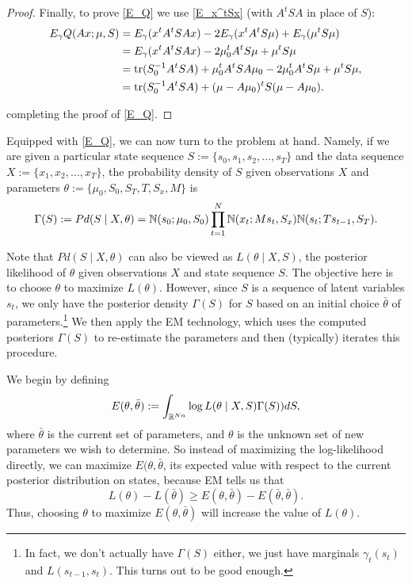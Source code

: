 \documentclass[12pt,leqno]{article}
\begin{document}
\begin{proof}
    Finally, to prove \eqref{E_Q} we  use \eqref{E_x^tSx} (with $A^tSA$ in place of $S$):
      \begin{align*}
        E_{\gamma}Q(Ax;\mu,S) &= E_{\gamma}(x^tA^tSAx) - 2E_{\gamma}(x^tA^tS\mu) + E_{\gamma}(\mu^tS\mu) \\
        &= E_{\gamma}(x^tA^tSAx) - 2\mu_0^tA^tS\mu + \mu^tS\mu\\
        &= \tr(S_0^{-1}A^tSA) + \mu_0^tA^tSA\mu_0 - 2\mu_0^tA^tS\mu + \mu^tS\mu,\\
        &= \tr(S_0^{-1}A^tSA) + (\mu-A\mu_0)^tS(\mu- A\mu_0). %
      \end{align*}

completing the proof of \eqref{E_Q}.
  \end{proof}
  
Equipped with \eqref{E_Q}, we can now turn to the problem at hand.  Namely, if we are given a particular
state sequence $S := \{s_0,s_1,s_2,\dots,s_T\}$ and the data sequence $X := \{x_1,x_2,\dots,x_T\}$,
the probability density of $S$ given observations $X$ and  parameters $\theta := \{\mu_0,S_0,S_T,T,S_x,M\}$ is
\begin{equation} \label{density}
\Gamma(S) := Pd(S\mid X,\theta) = {\mathbb N}(s_0;\mu_0,S_0)\prod_{t=1}^N{\mathbb N}(x_t;Ms_t,S_x){\mathbb N}(s_t;Ts_{t-1},S_T).
\end{equation}

Note that $Pd(S\mid X, \theta)$ can also be viewed as  $L(\theta\mid X,S)$, the posterior likelihood of $\theta$
given observations $X$ and state sequence $S$.  The objective here is to choose $\theta$ to maximize $L(\theta)$.
However, since $S$ is a sequence of latent variables $s_t$, we only have the posterior density $\Gamma(S)$ for $S$
based on an initial choice $\bar{\theta}$ of parameters.\footnote{In fact, we don't actually have $\Gamma(S)$ either, we just have marginals $\gamma_t(s_t)$ and $L(s_{t-1},s_t)$.  This turns out to be good enough.} We then apply the EM
technology, which uses the computed posteriors $\Gamma(S)$ to re-estimate the parameters and then (typically)
iterates this procedure.


We begin by defining 
$$
E(\theta,\bar{\theta}) := \int_{{\mathbb R}^{Nn}}\log{L(\theta\mid X,S)}\Gamma(S))dS,
$$
where $\bar{\theta}$ is the current set of parameters, and $\theta$ is the unknown set of new parameters
we wish to determine. So instead of maximizing the log-likelihood directly, we can maximize $E(\theta,\bar{\theta}$,
its expected value with respect to the current posterior distribution on states, because EM 
\cite{Dempster} tells us that
$$
L(\theta) - L(\bar{\theta}) \ge E(\theta,\bar{\theta}) - E(\bar{\theta},\bar{\theta}).
$$
Thus, choosing $\theta$ to maximize $E(\theta,\bar{\theta})$ will increase the value of $L(\theta)$.
\end{document}
